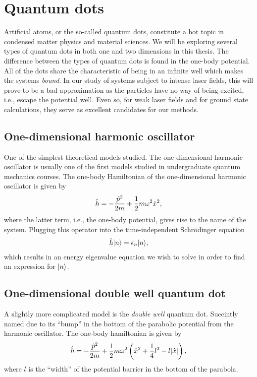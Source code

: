 \section{Quantum dots}
    Artificial atoms, or the so-called quantum dots, constitute a hot topic in
    condensed matter physics and material sciences. We will be exploring several
    types of quantum dots in both one and two dimensions in this thesis. The
    difference between the types of quantum dots is found in the one-body
    potential. All of the dots share the characteristic of being in an infinite
    well which makes the systems \emph{bound}. In our study of systems subject
    to intense laser fields, this will prove to be a bad approximation as the
    particles have no way of being excited, i.e., escape the potential well.
    Even so, for weak laser fields and for ground state calculations, they serve
    as excellent candidates for our methods.

    \subsection{One-dimensional harmonic oscillator}
        One of the simplest theoretical models studied. The one-dimensional
        harmonic oscillator is usually one of the first models studied in
        undergraduate quantum mechanics courses. The one-body Hamiltonian of the
        one-dimensional harmonic oscillator is given by
        \begin{align}
            \hat{h} = -\frac{\hat{p}^2}{2m} + \frac{1}{2} m\omega^2 \hat{x}^2,
        \end{align}
        where the latter term, i.e., the one-body potential, gives rise to the
        name of the system. Plugging this operator into the time-independent
        Schrödinger equation
        \begin{gather}
            \hat{h}| n \rangle = \epsilon_n| n \rangle,
        \end{gather}
        which results in an energy eigenvalue equation we wish to solve in order
        to find an expression for $| n \rangle$.

    \subsection{One-dimensional double well quantum dot}
        A slightly more complicated model is the \emph{double well} quantum dot.
        Succintly named due to its ``bump'' in the bottom of the parabolic
        potential from the harmonic oscillator. The one-body hamiltonian is
        given by
        \begin{align}
            \hat{h} = -\frac{\hat{p}^2}{2m}
            + \frac{1}{2} m\omega^2\left( 
                \hat{x}^2
                + \frac{1}{4}l^2
                - l|\hat{x}|
             \right),
        \end{align}
        where $l$ is the ``width'' of the potential barrier in the bottom of the
        parabola.

